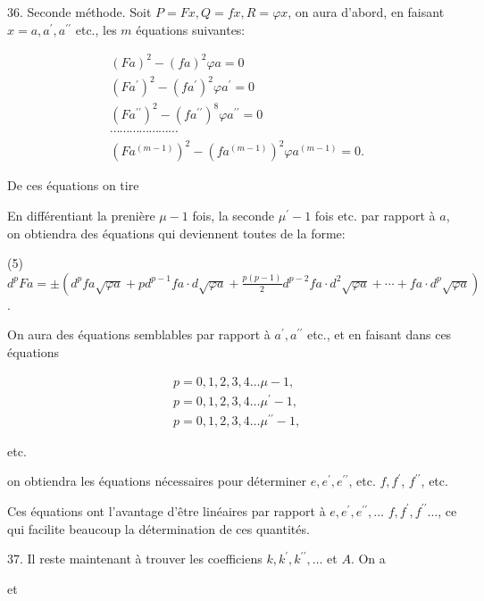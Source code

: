\documentclass{article}
\begin{document}
36. Seconde méthode. Soit \(P=F x, Q=f x, R=\varphi x\), on aura d'abord, en faisant \(x=a, a^{\prime}, a^{\prime \prime}\) etc., les \(m\) équations suivantes:

\[
\begin{aligned}
& (F a)^{2}-(f a)^{2} \varphi a=0 \\
& \left(F a^{\prime}\right)^{2}-\left(f a^{\prime}\right)^{2} \varphi a^{\prime}=0 \\
& \left(F a^{\prime \prime}\right)^{2}-\left(f a^{\prime \prime}\right)^{8} \varphi a^{\prime \prime}=0 \\
& \cdots \cdots \cdots \cdots \cdots \cdots \cdots \\
& \left(F a^{(m-1)}\right)^{2}-\left(f a^{(m-1)}\right)^{2} \varphi a^{(m-1)}=0 .
\end{aligned}
\]

De ces équations on tire


En différentiant la prenière \(\mu-1\) fois, la seconde \(\mu^{\prime}-1\) fois etc. par rapport à \(a\), on obtiendra des équations qui deviennent toutes de la forme:

(5) \(d^{p} F a= \pm\left(d^{p} f a \sqrt{\varphi a}+p d^{p-1} f a \cdot d \sqrt{\varphi a}+\frac{p(p-1)}{2} d^{p-2} f a \cdot d^{2} \sqrt{\varphi a}+\cdots+f a \cdot d^{p} \sqrt{\varphi a}\right)\).

On aura des équations semblables par rapport à \(a^{\prime}, a^{\prime \prime}\) etc., et en faisant dans ces équations

\[
\begin{aligned}
& p=0,1,2,3,4 \ldots \mu-1, \\
& p=0,1,2,3,4 \ldots \mu^{\prime}-1, \\
& p=0,1,2,3,4 \ldots \mu^{\prime \prime}-1,
\end{aligned}
\]

etc.

on obtiendra les équations nécessaires pour déterminer \(e, e^{\prime}, e^{\prime \prime}\), etc. \(f, f^{\prime}\), \(f^{\prime \prime}\), etc.

Ces équations ont l'avantage d'être linéaires par rapport à \(e, e^{\prime}, e^{\prime \prime}, \ldots\) \(f, f^{\prime}, f^{\prime \prime} \ldots\), ce qui facilite beaucoup la détermination de ces quantités.

37. Il reste maintenant à trouver les coefficiens \(k, k^{\prime}, k^{\prime \prime}, \ldots\) et \(A\). On a

et
\end{document}
